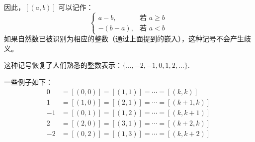 因此，$[(a,b)]$ 可以记作：
$$
\begin{cases}
a-b, & \text{若 } a \geq b \\[6pt]
-(b-a), & \text{若 } a < b
\end{cases}~
$$
如果自然数已被识别为相应的整数（通过上面提到的嵌入），这种记号不会产生歧义。

这种记号恢复了人们熟悉的整数表示：$\{ \ldots, -2, -1, 0, 1, 2, \ldots \}$.

一些例子如下：
$$
\begin{aligned}
0 &= [(0,0)] = [(1,1)] = \cdots = [(k,k)] \\[6pt]
1 &= [(1,0)] = [(2,1)] = \cdots = [(k+1,k)] \\[6pt]
-1 &= [(0,1)] = [(1,2)] = \cdots = [(k,k+1)] \\[6pt]
2 &= [(2,0)] = [(3,1)] = \cdots = [(k+2,k)] \\[6pt]
-2 &= [(0,2)] = [(1,3)] = \cdots = [(k,k+2)]
\end{aligned}~
$$
